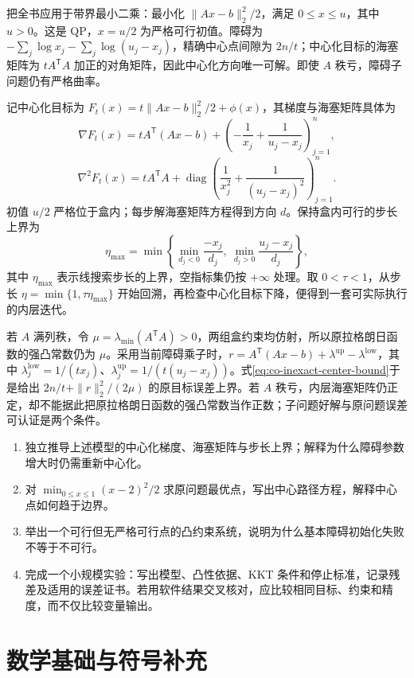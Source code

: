 \documentclass[UTF8,12pt,a4paper,fontset=fandol]{ctexbook}
\begin{document}
把全书应用于带界最小二乘：最小化 $\|Ax-b\|_2^2/2$，满足 $0\leq x\leq u$，其中 $u>0$。这是 QP，$x=u/2$ 为严格可行初值。障碍为 $-\sum_j\log x_j-\sum_j\log(u_j-x_j)$，精确中心点间隙为 $2n/t$；中心化目标的海塞矩阵为 $tA^{\mathsf T}A$ 加正的对角矩阵，因此中心化方向唯一可解。即使 $A$ 秩亏，障碍子问题仍有严格曲率。

记中心化目标为 $F_t(x)=t\|Ax-b\|_2^2/2+\phi(x)$，其梯度与海塞矩阵具体为
\[
 \nabla F_t(x)=tA^{\mathsf T}(Ax-b)
  +\left(-\frac1{x_j}+\frac1{u_j-x_j}\right)_{j=1}^n,
\]
\[
 \nabla^2F_t(x)=tA^{\mathsf T}A+
 \operatorname{diag}\left(\frac1{x_j^2}+\frac1{(u_j-x_j)^2}\right)_{j=1}^n.
\]
初值 $u/2$ 严格位于盒内；每步解海塞矩阵方程得到方向 $d$。保持盒内可行的步长上界为
\[
 \eta_{\max}=\min\left\{
 \min_{d_j<0}\frac{-x_j}{d_j},
 \ \min_{d_j>0}\frac{u_j-x_j}{d_j}
 \right\},
\]
其中 $\eta_{\max}$ 表示线搜索步长的上界，空指标集仍按 $+\infty$ 处理。取 $0<\tau<1$，从步长 $\eta=\min\{1,\tau\eta_{\max}\}$ 开始回溯，再检查中心化目标下降，便得到一套可实际执行的内层迭代。

若 $A$ 满列秩，令 $\mu=\lambda_{\min}(A^{\mathsf T}A)>0$，两组盒约束均仿射，所以原拉格朗日函数的强凸常数仍为 $\mu$。采用当前障碍乘子时，$r=A^{\mathsf T}(Ax-b)+\lambda^{\mathrm{up}}-\lambda^{\mathrm{low}}$，其中 $\lambda_j^{\mathrm{low}}=1/(tx_j)$、$\lambda_j^{\mathrm{up}}=1/(t(u_j-x_j))$。式\eqref{eq:co-inexact-center-bound}于是给出 $2n/t+\|r\|_2^2/(2\mu)$ 的原目标误差上界。若 $A$ 秩亏，内层海塞矩阵仍正定，却不能据此把原拉格朗日函数的强凸常数当作正数；子问题好解与原问题误差可认证是两个条件。

\begin{enumerate}
 \item 独立推导上述模型的中心化梯度、海塞矩阵与步长上界；解释为什么障碍参数增大时仍需重新中心化。
 \item 对 $\min_{0\leq x\leq1}(x-2)^2/2$ 求原问题最优点，写出中心路径方程，解释中心点如何趋于边界。
 \item 举出一个可行但无严格可行点的凸约束系统，说明为什么基本障碍初始化失败不等于不可行。
 \item 完成一个小规模实验：写出模型、凸性依据、KKT 条件和停止标准，记录残差及适用的误差证书。若用软件结果交叉核对，应比较相同目标、约束和精度，而不仅比较变量输出。
\end{enumerate}

\appendix

\chapter{数学基础与符号补充}
\label{app:co-background}
\end{document}
